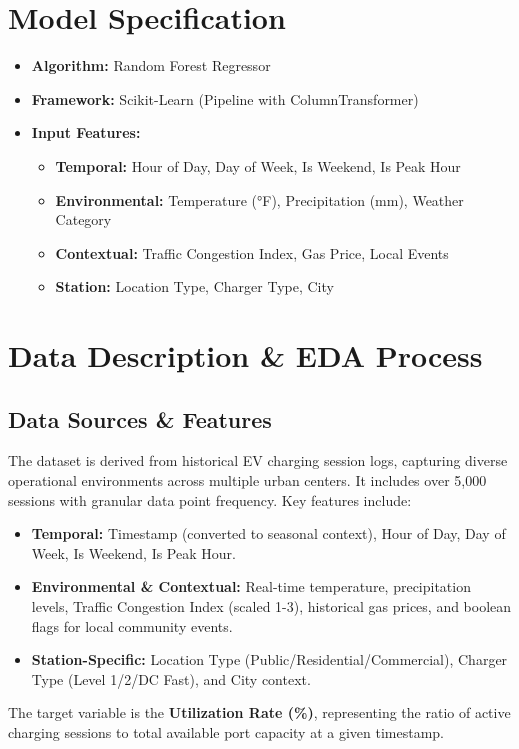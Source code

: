 \documentclass{article}
\begin{document}
\section{Model Specification}
\begin{itemize}
    \item \textbf{Algorithm:} Random Forest Regressor
    \item \textbf{Framework:} Scikit-Learn (Pipeline with ColumnTransformer)
    \item \textbf{Input Features:}
    \begin{itemize}
        \item \textbf{Temporal:} Hour of Day, Day of Week, Is Weekend, Is Peak Hour
        \item \textbf{Environmental:} Temperature (°F), Precipitation (mm), Weather Category
        \item \textbf{Contextual:} Traffic Congestion Index, Gas Price, Local Events
        \item \textbf{Station:} Location Type, Charger Type, City
    \end{itemize}
\end{itemize}

\section{Data Description \& EDA Process}
\subsection{Data Sources \& Features}
The dataset is derived from historical EV charging session logs, capturing diverse operational environments across multiple urban centers. It includes over 5,000 sessions with granular data point frequency. Key features include:
\begin{itemize}
    \item \textbf{Temporal:} Timestamp (converted to seasonal context), Hour of Day, Day of Week, Is Weekend, Is Peak Hour.
    \item \textbf{Environmental \& Contextual:} Real-time temperature, precipitation levels, Traffic Congestion Index (scaled 1-3), historical gas prices, and boolean flags for local community events.
    \item \textbf{Station-Specific:} Location Type (Public/Residential/Commercial), Charger Type (Level 1/2/DC Fast), and City context.
\end{itemize}
The target variable is the \textbf{Utilization Rate (\%)}, representing the ratio of active charging sessions to total available port capacity at a given timestamp.
\end{document}
